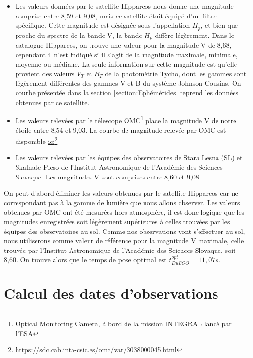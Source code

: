 \documentclass[10pt,french, openany]{book}
\begin{document}
    \begin{itemize}
        \item Les valeurs données par le satellite Hipparcos nous donne une magnitude comprise entre 8,59 et 9,08, mais ce satellite était équipé d'un filtre spécifique. Cette magnitude est désignée sous l'appellation $H_p$, et bien que proche du spectre de la bande V, la bande $H_p$ diffère légèrement. Dans le catalogue Hipparcos, on trouve une valeur pour la magnitude V de 8,68, cependant il n'est indiqué si il s'agit de la magnitude maximale, minimale, moyenne ou médiane. La seule information sur cette magnitude est qu'elle provient des valeurs $V_T$ et $B_T$ de la photométrie Tycho, dont les gammes sont légèrement différentes des gammes V et B du système Johnson Cousins. On courbe présentée dans la section \ref{section:Ephémérides} reprend les données obtenues par ce satellite. \cite{article:hipp, site:hipp, site:hptransmission}
        \item Les valeurs relevées par le télescope OMC\footnote{Optical Monitoring Camera, à bord de la mission INTEGRAL lancé par l'ESA} place la magnitude V de notre étoile entre 8,54 et 9,03. La courbe de magnitude relevée par OMC est disponible \href{https://sdc.cab.inta-csic.es/omc/var/3038000045.html}{ici}\footnote{https://sdc.cab.inta-csic.es/omc/var/3038000045.html}\cite{article:iomc, article:catiomc}
        \item Les valeurs relevées par les équipes des observatoires de Stara Lesna (SL) et Skalnate Pleso de l'Institut Astronomique de l'Académie des Sciences Slovaque. Les magnitudes V sont comprises entre 8,60 et 9,08.\cite{article:catiaass}
    \end{itemize}
    
    On peut d'abord éliminer les valeurs obtenues par le satellite Hipparcos car ne correspondant pas à la gamme de lumière que nous allons observer. Les valeurs obtenues par OMC ont été mesurées hors atmosphère, il est donc logique que les magnitudes enregistrées soit légèrement supérieures à celles trouvées par les équipes des observatoires au sol. Comme nos observations vont s'effectuer au sol, nous utiliserons comme valeur de référence pour la magnitude V maximale, celle trouvée par l'Institut Astronomique de l'Académie des Sciences Slovaque, soit 8,60.
    On trouve alors que le temps de pose optimal est $t^{opt}_{Du BOO} = 11,07 s$.
\pagebreak    
\section{Calcul des dates d'observations}
\end{document}
